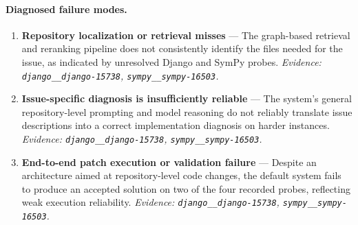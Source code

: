 \paragraph{Diagnosed failure modes.}\begin{enumerate}\itemsep1pt
\item \textbf{Repository localization or retrieval misses} --- The graph-based retrieval and reranking pipeline does not consistently identify the files needed for the issue, as indicated by unresolved Django and SymPy probes. \emph{Evidence: \texttt{django\_\_django-15738}, \texttt{sympy\_\_sympy-16503}.}
\item \textbf{Issue-specific diagnosis is insufficiently reliable} --- The system's general repository-level prompting and model reasoning do not reliably translate issue descriptions into a correct implementation diagnosis on harder instances. \emph{Evidence: \texttt{django\_\_django-15738}, \texttt{sympy\_\_sympy-16503}.}
\item \textbf{End-to-end patch execution or validation failure} --- Despite an architecture aimed at repository-level code changes, the default system fails to produce an accepted solution on two of the four recorded probes, reflecting weak execution reliability. \emph{Evidence: \texttt{django\_\_django-15738}, \texttt{sympy\_\_sympy-16503}.}
\end{enumerate}
